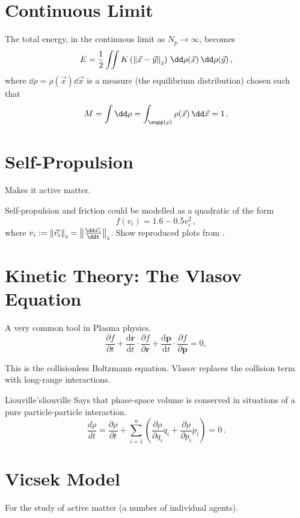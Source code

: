 \section{Continuous Limit}
The total energy, in the continuous limit as $N_p \rightarrow \infty$, becomes
$$E = \frac{1}{2} \iint K\left(\norm{\vec{x} - \vec{y}}\right) \,\dd\rho(\vec{x})\,\dd\rho(\vec{y})\,,$$
where $\dd\rho = \rho(\vec{x})\dd\vec{x}$ is a measure (the equilibrium distribution) chosen such that
$$M = \int \dd\rho = \int_{\supp(\rho)} \rho(\vec{x}) \,\dd\vec{x} = 1\,.$$

\section{Self-Propulsion}
Makes it active matter.

Self-propulsion and friction could be modelled as a quadratic of the form
$$f(v_i) = 1.6 - 0.5 v_i^2\,,$$
where $v_i := \norm{\vec{v_i}} = \norm{\frac{\dd\vec{x_i}}{\ddt}}$.
Show reproduced plots from \cite{2006-self-propelled}.

\hierKoennteIhreWerbungStehen


\section{Kinetic Theory: The Vlasov Equation}
A very common tool in Plasma physics.
$$\frac{\partial f}{\partial t}+{\frac {\mathrm {d} \mathbf {r} }{\mathrm {d} t}}\cdot {\frac {\partial f}{\partial \mathbf {r} }}+{\frac {\mathrm {d} \mathbf {p} }{\mathrm {d} t}}\cdot {\frac {\partial f}{\partial \mathbf {p} }}=0,$$

This is the collisionless Boltzmann equation.
Vlasov replaces the collision term with long-range interactions.

\begin{theorem}{Liouville's}{liouville}
  Says that phase-space volume is conserved in situations of a pure particle-particle interaction.
  $$\frac{d\rho}{dt}=
    \frac{\partial\rho}{\partial t}
    +\sum_{i=1}^n\left(\frac{\partial\rho}{\partial q_i}\dot{q}_i
    +\frac{\partial\rho}{\partial p_i}\dot{p}_i\right)=0\,.$$
\end{theorem}

\section{Vicsek Model}
For the study of active matter (a number of individual agents).


